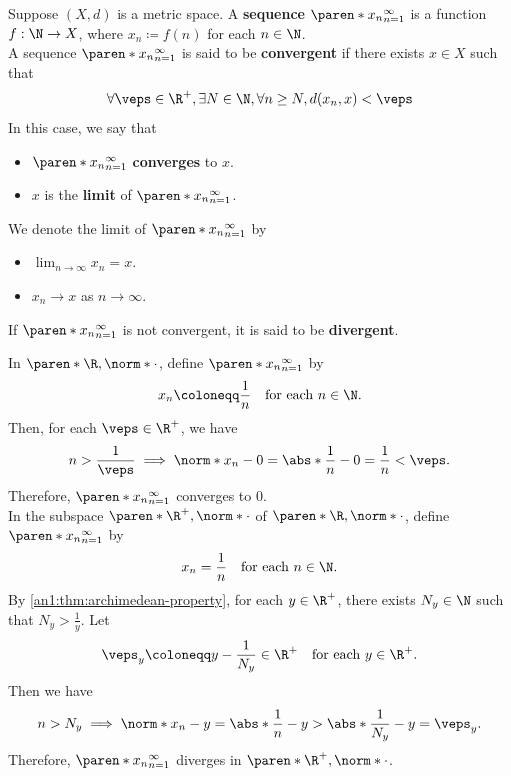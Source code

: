 \begin{definition} \label{an1:def:sequence-convergence}
  Suppose $(X, d)$ is a metric space. A \textbf{sequence} $\paren*{x_{n}}_{n = 1}^{\infty}$
  is a function $f: \N \to X$, where $x_{n} \coloneqq f(n)$ for each $n \in \N$.
  \\[6mm]
  A sequence $\paren*{x_{n}}_{n = 1}^{\infty}$ is said to be \textbf{convergent} if there exists $x \in X$ such that
  \[
    \forall \veps \in \R^{+}, \exists N \in \N, \forall n \geq N, d(x_{n}, x) < \veps
  \]
  In this case, we say that
  \begin{itemize}
    \item $\paren*{x_{n}}_{n = 1}^{\infty}$ \textbf{converges} to $x$.
    \item $x$ is the \textbf{limit} of $\paren*{x_{n}}_{n = 1}^{\infty}$.
  \end{itemize}
  We denote the limit of $\paren*{x_{n}}_{n = 1}^{\infty}$ by
  \begin{itemize}
    \item $\lim_{n \to \infty} x_{n} = x$.
    \item $x_{n} \to x$ as $n \to \infty$.
  \end{itemize}
  If $\paren*{x_{n}}_{n = 1}^{\infty}$ is not convergent, it is said to be \textbf{divergent}.

\end{definition}

\begin{example}
  In $\paren*{\R, \norm*{\cdot}}$, define $\paren*{x_{n}}_{n = 1}^{\infty}$ by
  \[
    x_{n} \coloneqq \frac{1}{n} \quad \text{for each } n \in \N.
  \]
  Then, for each $\veps \in \R^{+}$, we have
  \[
    n > \frac{1}{\veps} \implies \norm*{x_{n} - 0} = \abs*{\frac{1}{n} - 0} = \frac{1}{n} < \veps.
  \]
  Therefore, $\paren*{x_{n}}_{n = 1}^{\infty}$ converges to $0$.
  \\[6mm]
  In the subspace $\paren*{\R^{+}, \norm*{\cdot}}$ of $\paren*{\R, \norm*{\cdot}}$, define
  $\paren*{x_{n}}_{n = 1}^{\infty}$ by
  \[
    x_{n} = \frac{1}{n} \quad \text{for each } n \in \N.
  \]
  By \cref{an1:thm:archimedean-property}, for each $y \in \R^{+}$, there exists $N_{y} \in \N$ such that $N_{y} >
    \frac{1}{y}$. Let
  \[
    \veps_{y} \coloneqq y - \frac{1}{N_{y}} \in \R^{+} \quad \text{for each } y \in \R^{+}.
  \]
  Then we have
  \[
    n > N_{y} \implies \norm*{x_{n} - y} = \abs*{\frac{1}{n} - y} > \abs*{\frac{1}{N_{y}} - y} = \veps_{y}.
  \]
  Therefore, $\paren*{x_{n}}_{n = 1}^{\infty}$ diverges in $\paren*{\R^{+}, \norm*{\cdot}}$.
\end{example}

